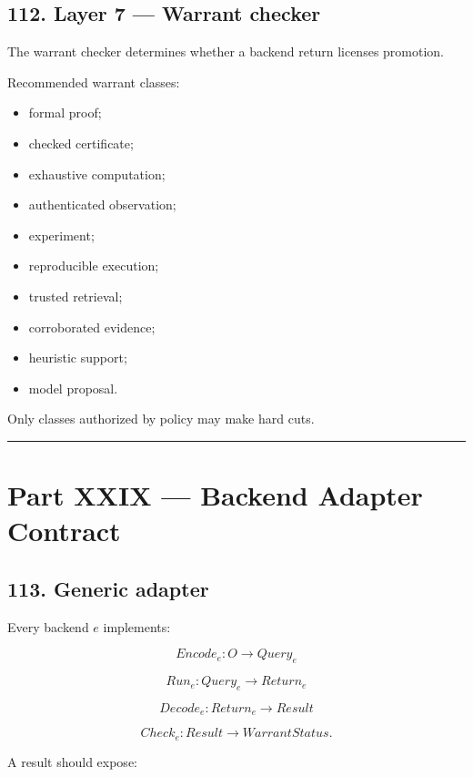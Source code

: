 \documentclass[
]{article}
\providecommand{\tightlist}{%
  \setlength{\itemsep}{0pt}\setlength{\parskip}{0pt}}
\begin{document}
\subsection{112. Layer 7 --- Warrant
checker}\label{layer-7-warrant-checker}

The warrant checker determines whether a backend return licenses
promotion.

Recommended warrant classes:

\begin{itemize}
\tightlist
\item
  formal proof;
\item
  checked certificate;
\item
  exhaustive computation;
\item
  authenticated observation;
\item
  experiment;
\item
  reproducible execution;
\item
  trusted retrieval;
\item
  corroborated evidence;
\item
  heuristic support;
\item
  model proposal.
\end{itemize}

Only classes authorized by policy may make hard cuts.

\begin{center}\rule{0.5\linewidth}{0.5pt}\end{center}

\section{Part XXIX --- Backend Adapter
Contract}\label{part-xxix-backend-adapter-contract}

\subsection{113. Generic adapter}\label{generic-adapter}

Every backend \(e\) implements:

\[
\boxed{
Encode_e
:
O
\to
Query_e
}
\]

\[
\boxed{
Run_e
:
Query_e
\to
Return_e
}
\]

\[
\boxed{
Decode_e
:
Return_e
\to
Result
}
\]

\[
\boxed{
Check_e
:
Result
\to
WarrantStatus.
}
\]

A result should expose:
\end{document}
